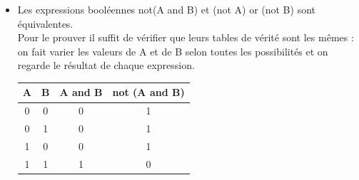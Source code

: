\begin{exemple}[s]
    \begin{itemize}
        \item 		Les expressions booléennes not(A and B) et (not A) or (not B) sont équivalentes.\\
              Pour le prouver il suffit de vérifier que leurs tables de vérité sont les mêmes : on fait varier les valeurs de A et de B selon toutes les possibilités et on regarde le résultat de chaque expression.
              \begin{center}
                  \begin{tabular}{|c|c|c|c|}
                      \hline\rowcolor{UGLiOrange}
                      {\boxfont\color{white}
                      A} & {\boxfont\color{white}B} & {\boxfont\color{white}A and B} & {\boxfont\color{white}not (A and B)} \\
                      \hline
                      0  & 0                        & 0                              & \cellcolor{UGLiOrange!25}	1          \\
                      \hline
                      0  & 1                        & 0                              & \cellcolor{UGLiOrange!25}	1          \\
                      \hline
                      1  & 0                        & 0                              & \cellcolor{UGLiOrange!25}	1          \\
                      \hline
                      1  & 1                        & 1                              & \cellcolor{UGLiOrange!25}	0          \\
                      \hline
                  \end{tabular}\\[2em]


\end{center}
\end{itemize}
\end{exemple}
